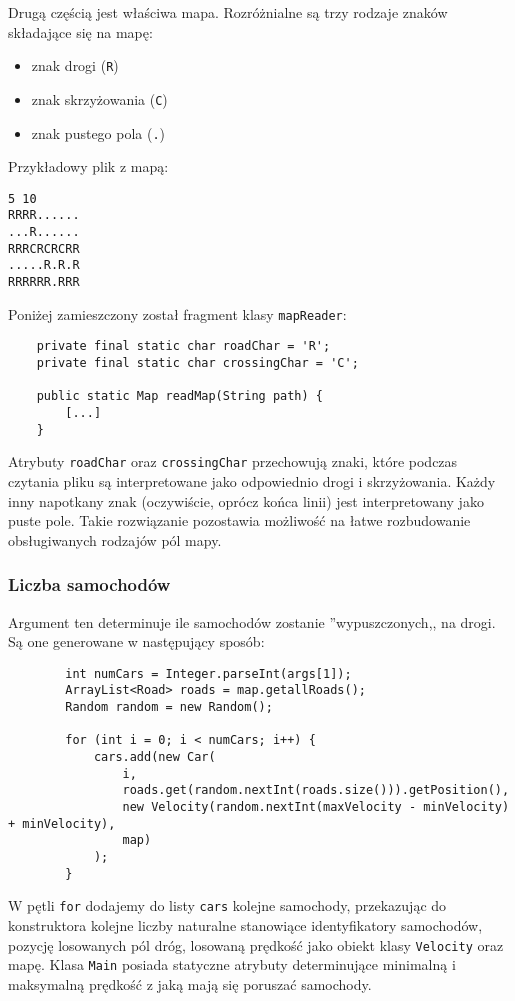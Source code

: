 \documentclass[a4paper]{article}
\begin{document}
Drugą częścią jest właściwa mapa. Rozróżnialne są trzy rodzaje znaków składające się na mapę:
\begin{itemize}
\item znak drogi (\verb+R+)
\item znak skrzyżowania (\verb+C+)
\item znak pustego pola (\verb+.+)
\end{itemize}

Przykładowy plik z mapą:
\begin{verbatim}
5 10
RRRR......
...R......
RRRCRCRCRR
.....R.R.R
RRRRRR.RRR
\end{verbatim}
Poniżej zamieszczony został fragment klasy \verb+mapReader+:
\begin{verbatim}
    private final static char roadChar = 'R';
    private final static char crossingChar = 'C';

    public static Map readMap(String path) {
        [...]
    }
\end{verbatim}
Atrybuty \verb+roadChar+ oraz \verb+crossingChar+ przechowują znaki, które podczas czytania pliku są interpretowane jako odpowiednio drogi i skrzyżowania. Każdy inny napotkany znak (oczywiście, oprócz końca linii) jest interpretowany jako puste pole.
Takie rozwiązanie pozostawia możliwość na łatwe rozbudowanie obsługiwanych rodzajów pól mapy.
\subsubsection{Liczba samochodów}
Argument ten determinuje ile samochodów zostanie ''wypuszczonych,, na drogi. Są one generowane w następujący sposób:
\begin{verbatim}
        int numCars = Integer.parseInt(args[1]);
        ArrayList<Road> roads = map.getallRoads();
        Random random = new Random();

        for (int i = 0; i < numCars; i++) {
            cars.add(new Car(
                i,
                roads.get(random.nextInt(roads.size())).getPosition(),
                new Velocity(random.nextInt(maxVelocity - minVelocity) + minVelocity),
                map)
            );
        }
\end{verbatim}
W pętli \verb+for+ dodajemy do listy \verb+cars+ kolejne samochody, przekazując do konstruktora kolejne liczby naturalne stanowiące identyfikatory samochodów, pozycję losowanych pól dróg, losowaną prędkość jako obiekt klasy \verb+Velocity+ oraz mapę. Klasa \verb+Main+ posiada statyczne atrybuty determinujące minimalną i maksymalną prędkość z jaką mają się poruszać samochody.
\end{document}
